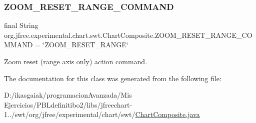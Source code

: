 \subsubsection{\texorpdfstring{Z\+O\+O\+M\+\_\+\+R\+E\+S\+E\+T\+\_\+\+R\+A\+N\+G\+E\+\_\+\+C\+O\+M\+M\+A\+ND}{ZOOM\_RESET\_RANGE\_COMMAND}}
{\footnotesize\ttfamily final String org.\+jfree.\+experimental.\+chart.\+swt.\+Chart\+Composite.\+Z\+O\+O\+M\+\_\+\+R\+E\+S\+E\+T\+\_\+\+R\+A\+N\+G\+E\+\_\+\+C\+O\+M\+M\+A\+ND = \char`\"{}Z\+O\+O\+M\+\_\+\+R\+E\+S\+E\+T\+\_\+\+R\+A\+N\+GE\char`\"{}\hspace{0.3cm}{\ttfamily [static]}}

Zoom reset (range axis only) action command. 

The documentation for this class was generated from the following file\+:\begin{DoxyCompactItemize}
\item 
D\+:/ikasgaiak/programacion\+Avanzada/\+Mis Ejercicios/\+P\+B\+Ldefinitibo2/libs/jfreechart-\/1../swt/org/jfree/experimental/chart/swt/\mbox{\hyperlink{_chart_composite_8java}{Chart\+Composite.\+java}}\end{DoxyCompactItemize}

